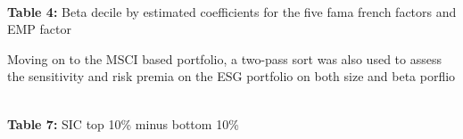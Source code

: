\begin{center}
    \paperspacingnarrow
    \\
    \textbf{Table 4:} Beta decile by estimated coefficients for the  five fama french factors and EMP factor\\
    \paperspacingwide
\end{center}

Moving on to the MSCI based portfolio, a two-pass sort was also used to assess the sensitivity and risk premia on the ESG portfolio on both size and  beta porflio 

\begin{center}
    \paperspacingnarrow
\\
\textbf{Table 7:} SIC top 10\% minus bottom 10\%
    \paperspacingwide
\end{center}